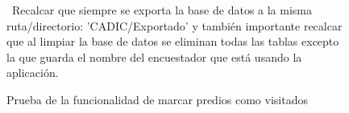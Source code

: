 \begin{figure}[h]
    \caption{Prueba de la funcionalidad de marcar predios como visitados}
    \label{fig:figura25}\
    Recalcar que siempre se exporta la base de datos a la misma ruta/directorio: 'CADIC/Exportado' y también importante recalcar que al limpiar la base de datos se eliminan todas las tablas
    excepto la que guarda el nombre del encuestador que está usando la aplicación.
\end{figure}

